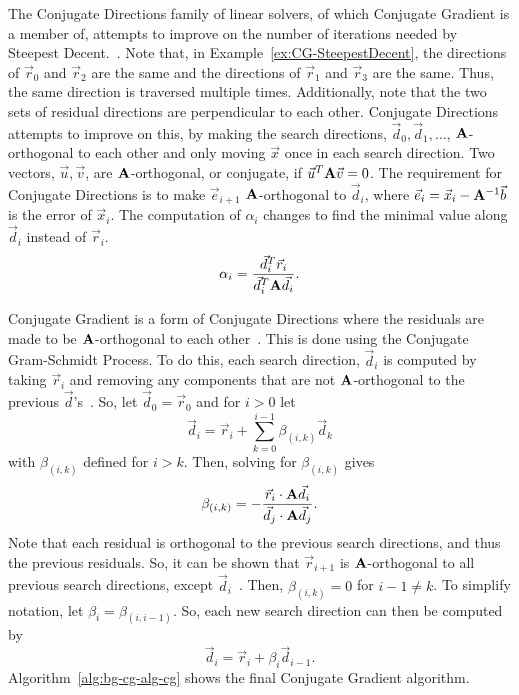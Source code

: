 The Conjugate Directions family of linear solvers, of which Conjugate Gradient is a member of, attempts to improve on the number of iterations needed by Steepest Decent.~\cite{Shewchuk:1994:IntroToCG}.
Note that, in Example~\ref{ex:CG-SteepestDecent}, the directions of \(\vec{r}_0\) and \(\vec{r}_2\) are the same and the directions of \(\vec{r}_1\) and \(\vec{r}_3\) are the same.
Thus, the same direction is traversed multiple times.
Additionally, note that the two sets of residual directions are perpendicular to each other.
Conjugate Directions attempts to improve on this, by making the search directions, \(\vec{d}_0, \vec{d}_1, \dots\), \(\mathbf{A}\)-orthogonal to each other and only moving \(\vec{x}\) once in each search direction.
Two vectors, \(\vec{u}, \vec{v}\), are \(\mathbf{A}\)-orthogonal, or conjugate, if \(\vec{u}^T\mathbf{A}\vec{v}=0\).
The requirement for Conjugate Directions is to make \(\vec{e}_{i+1}\) \(\mathbf{A}\)-orthogonal to \(\vec{d}_i\), where \(\vec{e}_i = \vec{x}_i - \mathbf{A}^{-1}\vec{b}\) is the error of \(\vec{x}_i\).
The computation of \(\alpha_i\) changes to find the minimal value along \(\vec{d}_i\) instead of \(\vec{r}_i\).
\[
	\alpha_i = \frac{\vec{d}_i^T\vec{r}_i}{\vec{d}_i^T\mathbf{A}\vec{d}_i}.
\]

Conjugate Gradient is a form of Conjugate Directions where the residuals are made to be \(\mathbf{A}\)-orthogonal to each other~\cite{Shewchuk:1994:IntroToCG}.
This is done using the Conjugate Gram-Schmidt Process.
To do this, each search direction, \(\vec{d}_i\) is computed by taking \(\vec{r}_i\) and removing any components that are not \(\mathbf{A}\)-orthogonal to the previous \(\vec{d}\)'s~\cite{Shewchuk:1994:IntroToCG}.
So, let \(\vec{d}_0 = \vec{r}_0\) and for \(i > 0\) let
\[
	\vec{d}_i = \vec{r}_i + \sum_{k=0}^{i-1} \beta_{(i, k)}\vec{d}_k
\]
with \(\beta_{(i, k)}\) defined for \(i > k\).
Then, solving for \(\beta_{(i, k)}\) gives
\[
	\beta_{(i, k)} = -\frac{\vec{r}_i\cdot\mathbf{A}\vec{d}_i}{\vec{d}_j\cdot\mathbf{A}\vec{d}_j}.
\]
Note that each residual is orthogonal to the previous search directions, and thus the previous residuals.
So, it can be shown that \(\vec{r}_{i+1}\) is \(\mathbf{A}\)-orthogonal to all previous search directions, except \(\vec{d}_i\)~\cite{Shewchuk:1994:IntroToCG}.
Then, \(\beta_{(i, k)} = 0\) for \(i-1 \neq k\).
To simplify notation, let \(\beta_i = \beta_{(i, i-1)}\).
So, each new search direction can then be computed by
\[
	\vec{d}_i = \vec{r}_i + \beta_i\vec{d}_{i-1}.
\]
Algorithm~\ref{alg:bg-cg-alg-cg} shows the final Conjugate Gradient algorithm.

